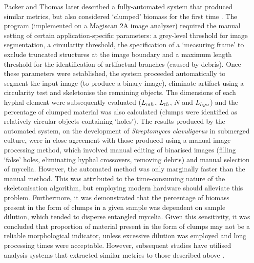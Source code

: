 Packer and Thomas later described a fully-automated system that produced similar metrics, but also considered \lq clumped' biomass for the first time \cite{packer1990}. The program (implemented on a Magiscan 2A image analyser) required the manual setting of certain application-specific parameters: a grey-level threshold for image segmentation, a circularity threshold, the specification of a \lq measuring frame' to exclude truncated structures at the image boundary and a maximum length threshold for the identification of artifactual branches (caused by debris). Once these parameters were established, the system proceeded automatically to segment the input image (to produce a binary image), eliminate artifact using a circularity test and skeletonise the remaining objects. The dimensions of each hyphal element were subsequently evaluated ($L_{mh}$, $L_{th}$, $N$ and $L_{hgu}$) and the percentage of clumped material was also calculated (clumps were identified as relatively circular objects containing \lq holes'). The results produced by the automated system, on the development of \emph{Streptomyces clavuligerus} in submerged culture, were in close agreement with those produced using a manual image processing method, which involved manual editing of binarised images (filling \lq false' holes, eliminating hyphal crossovers, removing debris) and manual selection of mycelia. However, the automated method was only marginally faster than the manual method. This was attributed to the time-consuming nature of the skeletonisation algorithm, but employing modern hardware should alleviate this problem. Furthermore, it was demonstrated that the percentage of biomass present in the form of clumps in a given sample was dependent on sample dilution, which tended to disperse entangled mycelia. Given this sensitivity, it was concluded that proportion of material present in the form of clumps may not be a reliable morphological indicator, unless excessive dilution was employed and long processing times were acceptable. However, subsequent studies have utilised analysis systems that extracted similar metrics to those described above \cite{elsabbagh2006}.


